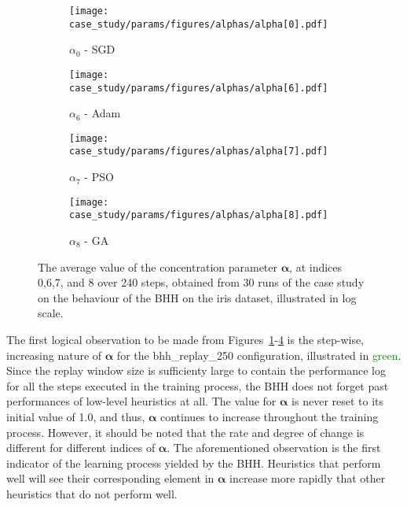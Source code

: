 \begin{figure}[htb]
	\begin{subfigure}{0.5\textwidth}
		\centering
		\texttt{[image: case\_study/params/figures/alphas/alpha[0].pdf]}
		\caption{$\alpha_{0}$ - \acs{SGD}}
		\label{fig:results:case_study:alphas:0}
	\end{subfigure}
	\begin{subfigure}{0.5\textwidth}
		\centering
		\texttt{[image: case\_study/params/figures/alphas/alpha[6].pdf]}
		\caption{$\alpha_{6}$ - \acs{Adam}}
		\label{fig:results:case_study:alphas:6}
	\end{subfigure}
	\par\bigskip
	\begin{subfigure}{0.5\textwidth}
		\centering
		\texttt{[image: case\_study/params/figures/alphas/alpha[7].pdf]}
		\caption{$\alpha_{7}$ - \acs{PSO}}
		\label{fig:results:case_study:alphas:7}
	\end{subfigure}
	\begin{subfigure}{0.5\textwidth}
		\centering
		\texttt{[image: case\_study/params/figures/alphas/alpha[8].pdf]}
		\caption{$\alpha_{8}$ - \acs{GA}}
		\label{fig:results:case_study:alphas:8}
	\end{subfigure}
	\par\bigskip
	\caption{The average value of the concentration parameter $\boldsymbol{\alpha}$, at indices 0,6,7, and 8 over 240 steps, obtained from 30 runs of the case study on the behaviour of the \acs{BHH} on the iris dataset, illustrated in log scale.}
	\label{fig:results:case_study:alphas}
\end{figure}

The first logical observation to be made from Figures~\ref{fig:results:case_study:alphas:0}-\ref{fig:results:case_study:alphas:8} is the step-wise, increasing nature of $\boldsymbol{\alpha}$ for the bhh\_replay\_250 configuration, illustrated in \textcolor{green}{green}. Since the replay window size is sufficienty large to contain the performance log for all the steps executed in the training process, the \acs{BHH} does not forget past performances of low-level heuristics at all. The value for $\boldsymbol{\alpha}$ is never reset to its initial value of 1.0, and thus, $\boldsymbol{\alpha}$ continues to increase throughout the training process. However, it should be noted that the rate and degree of change is different for different indices of $\boldsymbol{\alpha}$. The aforementioned observation is the first indicator of the learning process yielded by the \acs{BHH}. Heuristics that perform well will see their corresponding element in $\boldsymbol{\alpha}$ increase more rapidly that other heuristics that do not perform well.

